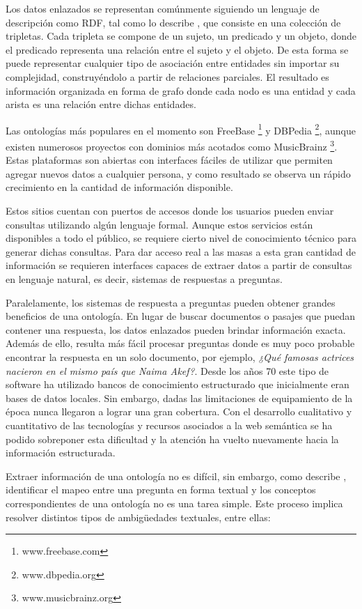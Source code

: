 Los datos enlazados se representan comúnmente siguiendo un lenguaje de descripción como RDF, tal como lo describe \citet{brickleyRDF}, que consiste en una colección de tripletas. Cada tripleta se compone de un sujeto, un predicado y un objeto, donde el predicado representa una relación entre el sujeto y el objeto. De esta forma se puede representar cualquier tipo de asociación entre entidades sin importar su complejidad, construyéndolo a partir de relaciones parciales. El resultado es información organizada en forma de grafo donde cada nodo es una entidad y cada arista es una relación entre dichas entidades.

Las ontologías más populares en el momento son FreeBase \footnote{www.freebase.com} y DBPedia \footnote{www.dbpedia.org}, aunque existen numerosos proyectos con dominios más acotados como MusicBrainz \footnote{www.musicbrainz.org}. Estas plataformas son abiertas con interfaces fáciles de utilizar que permiten agregar nuevos datos a cualquier persona, y como resultado se observa un rápido crecimiento en la cantidad de información disponible.

Estos sitios cuentan con puertos de accesos donde los usuarios pueden enviar consultas utilizando algún lenguaje formal. Aunque estos servicios están disponibles a todo el público, se requiere cierto nivel de conocimiento técnico para generar dichas consultas. Para dar acceso real a las masas a esta gran cantidad de información se requieren interfaces capaces de extraer datos a partir de consultas en lenguaje natural, es decir, sistemas de respuestas a preguntas.

Paralelamente, los sistemas de respuesta a preguntas pueden obtener grandes beneficios de una ontología. En lugar de buscar documentos o pasajes que puedan contener una respuesta, los datos enlazados pueden brindar información exacta. Además de ello, resulta más fácil procesar preguntas donde es muy poco probable encontrar la respuesta en un solo documento, por ejemplo, \textit{¿Qué famosas actrices nacieron en el mismo país que Naima Akef?}. Desde los años 70 este tipo de software ha utilizado bancos de conocimiento estructurado que inicialmente eran bases de datos locales. Sin embargo, dadas las limitaciones de equipamiento de la época nunca llegaron a lograr una gran cobertura. Con el desarrollo cualitativo y cuantitativo de las tecnologías y recursos asociados a la web semántica se ha podido sobreponer esta dificultad y la atención ha vuelto nuevamente hacia la información estructurada.

Extraer información de una ontología no es difícil, sin embargo, como describe \citet{ungerQALD}, identificar el mapeo entre una pregunta en forma textual y los conceptos correspondientes de una ontología no es una tarea simple. Este proceso implica resolver distintos tipos de ambigüedades textuales, entre ellas:


